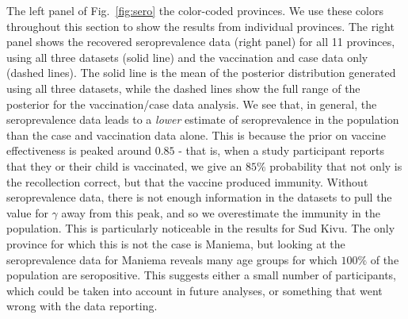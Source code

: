 \documentclass[nofootinbib,aps,pre,twocolumn,superscriptaddress,showkeys,showpacs]{revtex4-1}
\begin{document}
The left panel of Fig.~\ref{fig:sero} the color-coded provinces. We use these colors throughout this section to show the results from individual provinces. The right panel shows the recovered seroprevalence data (right panel) for all 11 provinces, using all three datasets (solid line) and the vaccination and case data only (dashed lines). The solid line is the mean of the posterior distribution generated using all three datasets, while the dashed lines show the full range of the posterior for the vaccination/case data analysis. We see that, in general, the seroprevalence data leads to a \emph{lower} estimate of seroprevalence in the population than the case and vaccination data alone. This is because the prior on vaccine effectiveness is peaked around $0.85$ - that is, when a study participant reports that they or their child is vaccinated, we give an $85\%$ probability that not only is the recollection correct, but that the vaccine produced immunity. Without seroprevalence data, there is not enough information in the datasets to pull the value for $\gamma$ away from this peak, and so we overestimate the immunity in the population. This is particularly noticeable in the results for Sud Kivu. The only province for which this is not the case is Maniema, but looking at the seroprevalence data for Maniema reveals many age groups for which $100\%$ of the population are seropositive. This suggests either a small number of participants, which could be taken into account in future analyses, or something that went wrong with the data reporting.
\end{document}
